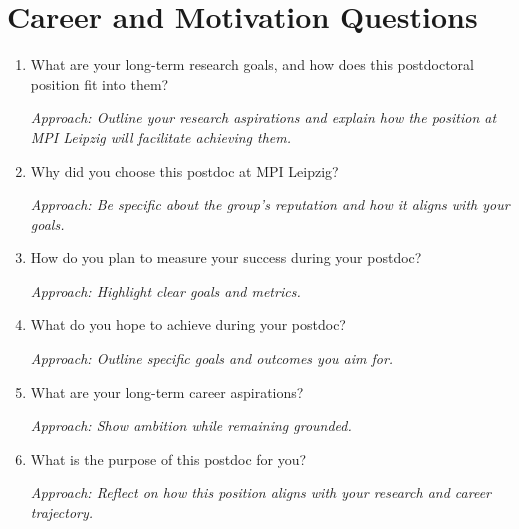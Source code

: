 \documentclass[12pt]{article}
\numberwithin{equation}{section}
\begin{document}
\section{Career and Motivation Questions}
\begin{enumerate}
    \item What are your long-term research goals, and how does this postdoctoral position fit into them?
    
    \textit{Approach: Outline your research aspirations and explain how the position at MPI Leipzig will facilitate achieving them.}

    \item Why did you choose this postdoc at MPI Leipzig?
    
    \textit{Approach: Be specific about the group’s reputation and how it aligns with your goals.}

    \item How do you plan to measure your success during your postdoc?
    
    \textit{Approach: Highlight clear goals and metrics.}

    \item What do you hope to achieve during your postdoc?
    
    \textit{Approach: Outline specific goals and outcomes you aim for.}

    \item What are your long-term career aspirations?
    
    \textit{Approach: Show ambition while remaining grounded.}

    \item What is the purpose of this postdoc for you?
    
    \textit{Approach: Reflect on how this position aligns with your research and career trajectory.}
\end{enumerate}
\end{document}
